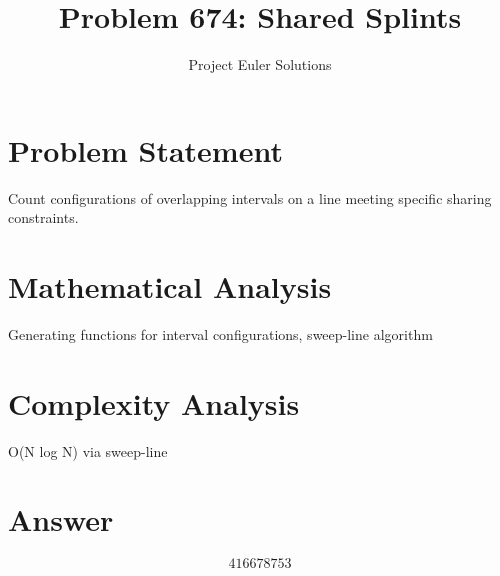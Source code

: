 \documentclass[11pt]{article}
\title{Problem 674: Shared Splints}
\author{Project Euler Solutions}
\date{}
\begin{document}
\maketitle

\section{Problem Statement}

Count configurations of overlapping intervals on a line meeting specific sharing constraints.

\section{Mathematical Analysis}

Generating functions for interval configurations, sweep-line algorithm

\section{Complexity Analysis}

O(N log N) via sweep-line

\section{Answer}

\[
\boxed{416678753}
\]
\end{document}
